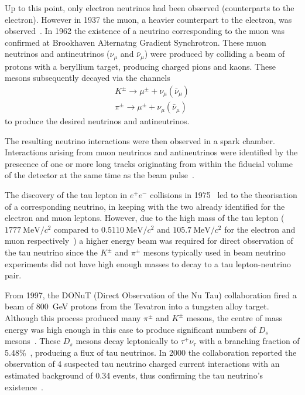 Up to this point, only electron neutrinos had been observed (counterparts to the electron).
However in 1937 the muon, a heavier counterpart to the electron, was observed~\cite{muonDiscovery}.
In 1962 the existence of a neutrino corresponding to the muon was confirmed at Brookhaven Alternatng Gradient Synchrotron.
These muon neutrinos and antineutrinos ($\nu_{\mu}$ and $\bar{\nu}_{\mu}$) were produced by colliding a beam of protons with a beryllium target, producing charged pions and kaons.
These mesons subsequently decayed via the channels
\begin{align}
    K^{\pm} \rightarrow \mu^{\pm} + \nu_{\mu}(\bar{\nu}_{\mu}) \\
    \pi^{\pm} \rightarrow \mu^{\pm} + \nu_{\mu}(\bar{\nu}_{\mu})
\end{align}
to produce the desired neutrinos and antineutrinos.

The resulting neutrino interactions were then observed in a spark chamber.
Interactions arising from muon neutrinos and antineutrinos were identified by the prescence of one or more long tracks originating from within the fiducial volume of the detector at the same time as the beam pulse~\cite{numuDiscovery}.   


The discovery of the tau lepton in $e^{+}e^{-}$ collisions in 1975~\cite{tauLepton} led to the theorisation of a corresponding neutrino, in keeping with the two already identified for the electron and muon leptons.
However, due to the high mass of the tau lepton ($1777~\text{MeV}/c^{2}$ compared to $0.5110~\text{MeV}/c^{2}$ and $105.7~\text{MeV}/c^{2}$ for the electron and muon respectively~\cite{pdg2018}) a higher energy beam was required for direct observation of the tau neutrino since the $K^{\pm}$ and $\pi^{\pm}$ mesons typically used in beam neutrino experiments did not have high enough masses to decay to a tau lepton-neutrino pair.

From 1997, the DONuT (Direct Observation of the Nu Tau) collaboration fired a beam of 800~GeV protons from the Tevatron into a tungsten alloy target.
Although this process produced many $\pi^{\pm}$ and $K^{\pm}$ mesons, the centre of mass energy was high enough in this case to produce significant numbers of $D_{s}$ mesons~\cite{donutFinal}.
These $D_{s}$ mesons decay leptonically to $\tau^{+}\nu_{\tau}$ with a branching fraction of 5.48\%~\cite{dsFraction}, producing a flux of tau neutrinos.
In 2000 the collaboration reported the observation of 4 suspected tau neutrino charged current interactions with an estimated background of 0.34 events, thus confirming the tau neutrino's existence~\cite{tauNeutrino}.  

